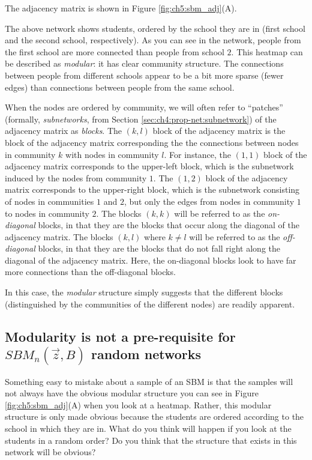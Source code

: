 The adjacency matrix is shown in Figure \ref{fig:ch5:sbm_adj}(A).

The above network shows students, ordered by the school they are in (first school and the second school, respectively). As you can see in the network, people from the first school are more connected than people from school $2$. This heatmap can be described as \textit{modular}: it has clear community structure. The connections between people from different schools appear to be a bit {more sparse} (fewer edges) than connections between people from the same school.

When the nodes are ordered by community, we will often refer to ``patches'' (formally, \textit{subnetworks}, from Section \ref{sec:ch4:prop-net:subnetwork}) of the adjacency matrix as \textit{blocks}. The $(k, l)$ block of the adjacency matrix is the block of the adjacency matrix corresponding the the connections between nodes in community $k$ with nodes in community $l$. For instance, the $(1, 1)$ block of the adjacency matrix corresponds to the upper-left block, which is the subnetwork induced by the nodes from community $1$. The $(1,2)$ block of the adjacency matrix corresponds to the upper-right block, which is the subnetwork consisting of nodes in communities $1$ and $2$, but only the edges from nodes in community $1$ to nodes in community $2$. The blocks $(k, k)$ will be referred to as the \textit{on-diagonal} blocks, in that they are the blocks that occur along the diagonal of the adjacency matrix. The blocks $(k, l)$ where $k \neq l$ will be referred to as the \textit{off-diagonal} blocks, in that they are the blocks that do not fall right along the diagonal of the adjacency matrix. Here, the on-diagonal blocks look to have far more connections than the off-diagonal blocks.

In this case, the \textit{modular} structure simply suggests that the different blocks (distinguished by the communities of the different nodes) are readily apparent.


\subsection{Modularity is not a pre-requisite for $SBM_n(\vec z, B)$ random networks}
\label{sec:ch5:sbm:modularity}

Something easy to mistake about a sample of an SBM is that the samples will {not always} have the obvious modular structure you can see in Figure \ref{fig:ch5:sbm_adj}(A) when you look at a heatmap. Rather, this modular structure is {only} made obvious because the students are ordered according to the school in which they are in. What do you think will happen if you look at the students in a random order? Do you think that the structure that exists in this network will be obvious?

